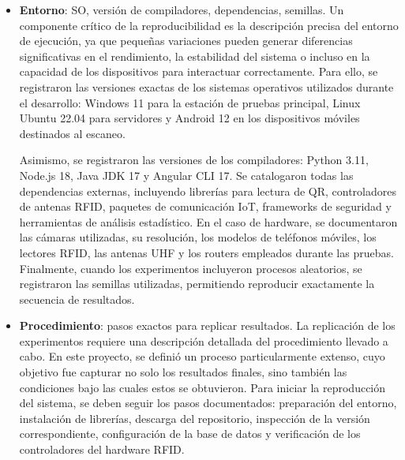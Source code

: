 \begin{itemize}[leftmargin=*]
  Las instrucciones de ejecución incluyen las dependencias necesarias, los comandos de compilación, la configuración de entornos virtuales, la inicialización de servicios externos como la base de datos y los procedimientos para instalar controladores especializados de lectores RFID. Se incluyeron también los requerimientos de hardware, las consideraciones específicas para ejecutar el sistema en Windows, Linux o Android, y las advertencias relacionadas con la compatibilidad de versiones de librerías. Esta documentación permite no solo reproducir el sistema en su totalidad, sino también desplegarlo en nuevos entornos institucionales sin riesgo de errores por ambigüedad.

  \item \textbf{Entorno}: SO, versión de compiladores, dependencias, semillas.  
  Un componente crítico de la reproducibilidad es la descripción precisa del entorno de ejecución, ya que pequeñas variaciones pueden generar diferencias significativas en el rendimiento, la estabilidad del sistema o incluso en la capacidad de los dispositivos para interactuar correctamente. Para ello, se registraron las versiones exactas de los sistemas operativos utilizados durante el desarrollo: Windows 11 para la estación de pruebas principal, Linux Ubuntu 22.04 para servidores y Android 12 en los dispositivos móviles destinados al escaneo.

  Asimismo, se registraron las versiones de los compiladores: Python 3.11, Node.js 18, Java JDK 17 y Angular CLI 17. Se catalogaron todas las dependencias externas, incluyendo librerías para lectura de QR, controladores de antenas RFID, paquetes de comunicación IoT, frameworks de seguridad y herramientas de análisis estadístico. En el caso de hardware, se documentaron las cámaras utilizadas, su resolución, los modelos de teléfonos móviles, los lectores RFID, las antenas UHF y los routers empleados durante las pruebas. Finalmente, cuando los experimentos incluyeron procesos aleatorios, se registraron las semillas utilizadas, permitiendo reproducir exactamente la secuencia de resultados.

  \item \textbf{Procedimiento}: pasos exactos para replicar resultados.  
  La replicación de los experimentos requiere una descripción detallada del procedimiento llevado a cabo. En este proyecto, se definió un proceso particularmente extenso, cuyo objetivo fue capturar no solo los resultados finales, sino también las condiciones bajo las cuales estos se obtuvieron. Para iniciar la reproducción del sistema, se deben seguir los pasos documentados: preparación del entorno, instalación de librerías, descarga del repositorio, inspección de la versión correspondiente, configuración de la base de datos y verificación de los controladores del hardware RFID.


\end{itemize}
